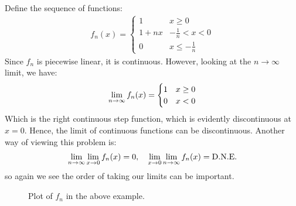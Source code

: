 \begin{nexample}{}{}
    Define the sequence of functions:
    \begin{align*}
        f_n(x) = \begin{cases}
            1 & x \geq 0
            \\ 1 + nx & -\frac{1}{n} < x < 0
            \\ 0 & x \leq -\frac{1}{n}
        \end{cases}
    \end{align*}
    Since $f_n$ is piecewise linear, it is continuous. However, looking at the $n \rightarrow \infty$ limit, we have:
    \begin{align*}
        \lim_{n \rightarrow \infty} f_n(x) = \begin{cases}
            1 & x \geq 0
            \\ 0 & x < 0
        \end{cases}
    \end{align*}
    Which is the right continuous step function, which is evidently discontinuous at $x = 0$. Hence, the limit of continuous functions can be discontinuous. Another way of viewing this problem is:
    \begin{align*}
        \lim_{n \rightarrow \infty} \lim_{x \rightarrow 0} f_n(x) = 0, \quad \lim_{x \rightarrow 0} \lim_{n \rightarrow \infty} f_n(x) = \text{D.N.E.}
    \end{align*}
    so again we see the order of taking our limits can be important.
\end{nexample}
\begin{figure}[htbp]
    \centering
    
    
    \caption{Plot of $f_n$ in the above example.}
    \label{fig37}
\end{figure}

\setcounter{rudin}{3}

